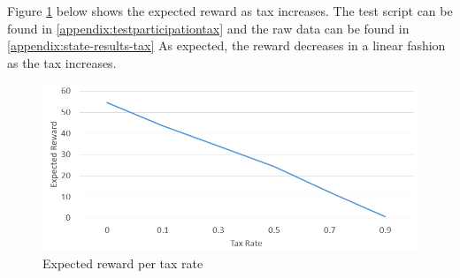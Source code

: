 Figure \ref{figure:state-expected-tax} below shows the expected reward as tax increases. The test script can be found in \cref{appendix:testparticipationtax} and the raw data can be found in \cref{appendix:state-results-tax} As expected, the reward decreases in a linear fashion as the tax increases.

\begin{figure}[H]
  \centering
  \caption{Expected reward per tax rate}
  \label{figure:state-expected-tax}
  \includegraphics[width=\textwidth]{media/state-expected-tax.PNG}
\end{figure}
